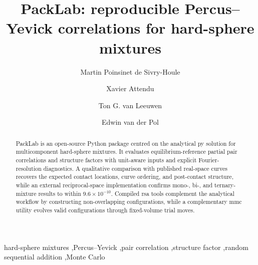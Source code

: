 \documentclass[preprint,12pt]{elsarticle}
\begin{document}
\begin{frontmatter}

\title{PackLab: reproducible Percus--Yevick correlations for hard-sphere mixtures}

\author[amsterdamumc]{Martin Poinsinet de Sivry-Houle}
\author[amsterdamumc]{Xavier Attendu}
\author[amsterdamumc]{Ton G. van Leeuwen}
\author[amsterdamumc]{Edwin van der Pol}

\begin{abstract}
PackLab is an open-source Python package centred on the analytical \gls{py} solution for multicomponent hard-sphere mixtures. %
It evaluates equilibrium-reference partial pair correlations and structure factors with unit-aware inputs and explicit Fourier-resolution diagnostics. %
A qualitative comparison with published real-space curves recovers the expected contact locations, curve ordering, and post-contact structure, while an external reciprocal-space implementation confirms mono-, bi-, and ternary-mixture results to within $9.6\times10^{-10}$. %
Compiled \gls{rsa} tools complement the analytical workflow by constructing non-overlapping configurations, while a complementary \gls{mmc} utility evolves valid configurations through fixed-volume trial moves. %
\end{abstract}
\glsresetall

\begin{keyword}
hard-sphere mixtures \sep Percus--Yevick \sep pair correlation \sep structure factor \sep random sequential addition \sep Monte Carlo
\end{keyword}

\end{frontmatter}

\modulolinenumbers[1]
\linenumbers
\end{document}
